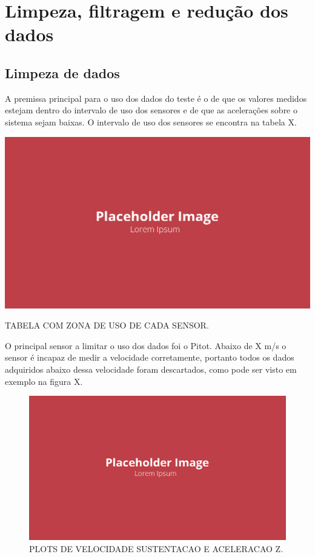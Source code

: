 \section{Limpeza, filtragem e redução dos dados}

\subsection{Limpeza de dados}

A premissa principal para o uso dos dados do teste é o de que os valores medidos estejam dentro do intervalo de uso dos sensores e de que as acelerações sobre o sistema sejam baixas. O intervalo de uso dos sensores se encontra na tabela X.

\begin{table}[!ht]
    \centering
    \includegraphics[width=.8\linewidth]{figuras/outras/placeholder.png}
    \caption{TABELA COM ZONA DE USO DE CADA SENSOR\cite{autor}.}
    \label{fig:placeholder}
\end{table}

O principal sensor a limitar o uso dos dados foi o Pitot. Abaixo de X m/s o sensor é incapaz de medir a velocidade corretamente, portanto todos os dados adquiridos abaixo dessa velocidade foram descartados, como pode ser visto em exemplo na figura X.

\begin{figure}[!ht]
    \centering
    \includegraphics[width=.8\linewidth]{figuras/outras/placeholder.png}
    \caption{PLOTS DE VELOCIDADE SUSTENTACAO E ACELERACAO Z\cite{autor}.}
    \label{fig:placeholder}
\end{figure}

